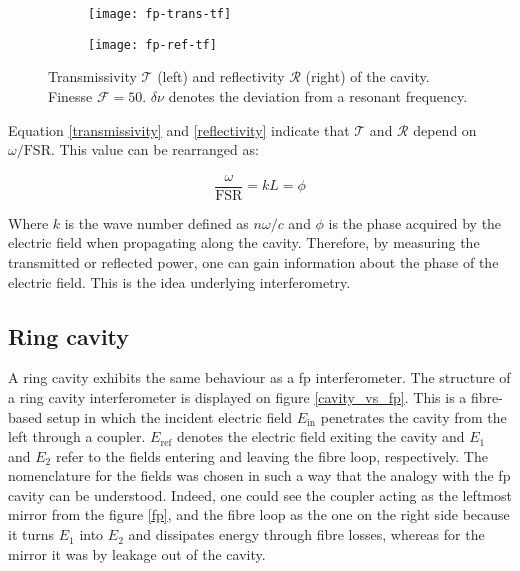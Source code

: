\begin{figure}[h]
	\centering
	\begin{subfigure}{.5\textwidth}
		\centering
		\texttt{[image: fp-trans-tf]}
	\end{subfigure}%
	\begin{subfigure}{.5\textwidth}
		\centering
		\texttt{[image: fp-ref-tf]}
	\end{subfigure}
	\caption{Transmissivity $\mathcal{T}$ (left) and reflectivity $\mathcal{R}$ (right) of the cavity. Finesse $\mathcal{F}=50$. $\delta \nu$ denotes the deviation from a resonant frequency.}
	\label{fp-tf}
\end{figure}

Equation \eqref{transmissivity} and \eqref{reflectivity} indicate that $\mathcal{T}$ and $\mathcal{R}$ depend on $\omega/\text{FSR}$. This value can be rearranged as:

\begin{equation}
	\frac{\omega}{\text{FSR}} = kL = \phi
\end{equation}

Where $k$ is the wave number defined as $n \omega/c$ and $\phi$ is the phase acquired by the electric field when propagating along the cavity. Therefore, by measuring the transmitted or reflected power, one can gain information about the phase of the electric field. This is the idea underlying interferometry.


\subsection{Ring cavity}

A ring cavity exhibits the same behaviour as a \gls{fp} interferometer. The structure of a ring cavity interferometer is displayed on figure \ref{cavity_vs_fp}. This is a fibre-based setup in which the incident electric field $E_{\text{in}}$ penetrates the cavity from the left through a coupler. $E_{\text{ref}}$ denotes the electric field exiting the cavity and $E_1$ and $E_2$ refer to the fields entering and leaving the fibre loop, respectively. The nomenclature for the fields was chosen in such a way that the analogy with the \gls{fp} cavity can be understood. Indeed, one could see the coupler acting as the leftmost mirror from the figure \ref{fp}, and the fibre loop as the one on the right side because it turns $E_1$ into $E_2$ and dissipates energy through fibre losses, whereas for the mirror it was by leakage out of the cavity.

